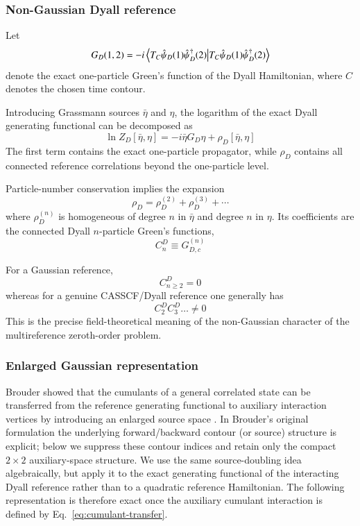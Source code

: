 \documentclass[aip,jcp,reprint,noshowkeys,superscriptaddress]{revtex4-1}
\begin{document}
\subsubsection{Non-Gaussian Dyall reference}

Let
\begin{equation}
  G_D(1,2)
  =
  -i
  \braket{
    T_C
    \hat\psi_D(1)
    \hat\psi_D^\dagger(2)
  }
\end{equation}
denote the exact one-particle Green's function of the Dyall Hamiltonian,
where $C$ denotes the chosen time contour.

Introducing Grassmann sources $\bar\eta$ and $\eta$, the logarithm of the
exact Dyall generating functional can be decomposed as
\begin{equation}
  \ln Z_D[\bar\eta,\eta]
  =
  -i \bar\eta G_D \eta
  +
  \rho_D[\bar\eta,\eta]
  \label{eq:dyall-generating-functional}
\end{equation}
The first term contains the exact one-particle propagator, while
$\rho_D$ contains all connected reference correlations beyond the
one-particle level.

Particle-number conservation implies the expansion
\begin{equation}
  \rho_D
  =
  \rho_D^{(2)}
  +
  \rho_D^{(3)}
  +
  \cdots
\end{equation}
where $\rho_D^{(n)}$ is homogeneous of degree $n$ in $\bar\eta$ and
degree $n$ in $\eta$.  Its coefficients are the connected Dyall
$n$-particle Green's functions,
\begin{equation}
  C_n^D
  \equiv
  G_{D,c}^{(n)}
\end{equation}

For a Gaussian reference,
\begin{equation}
  C_{n\ge 2}^D = 0
\end{equation}
whereas for a genuine CASSCF/Dyall reference one generally has
\begin{equation}
  C_2^D
  C_3^D
  \ldots
  \neq 0
\end{equation}
This is the precise field-theoretical meaning of the non-Gaussian
character of the multireference zeroth-order problem.


\subsubsection{Enlarged Gaussian representation}

Brouder showed that the cumulants of a general correlated state can be
transferred from the reference generating functional to auxiliary
interaction vertices by introducing an enlarged source space
\cite{Brouder2007}.  In Brouder's original formulation the underlying
forward/backward contour (or source) structure is explicit; below we suppress
these contour indices and retain only the compact $2\times2$ auxiliary-space
structure.  We use the same source-doubling idea algebraically, but apply it
to the exact generating functional of the interacting Dyall reference rather
than to a quadratic reference Hamiltonian.  The following representation is
therefore exact once the auxiliary cumulant interaction is defined by
Eq.~\eqref{eq:cumulant-transfer}.
\end{document}
